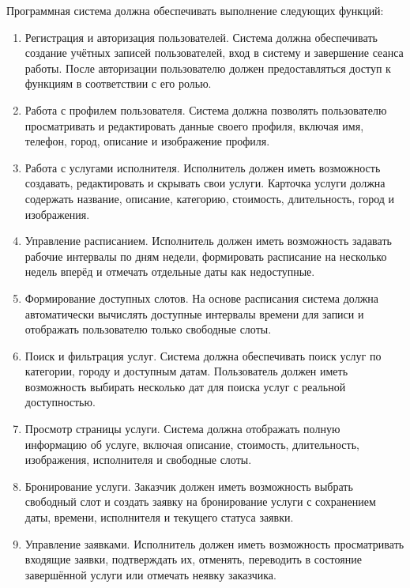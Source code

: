 Программная система должна обеспечивать выполнение следующих функций:
\begin{enumerate}
	\item Регистрация и авторизация пользователей.  
	Система должна обеспечивать создание учётных записей пользователей, вход в систему и завершение сеанса работы. После авторизации пользователю должен предоставляться доступ к функциям в соответствии с его ролью.
	
	\item Работа с профилем пользователя.  
	Система должна позволять пользователю просматривать и редактировать данные своего профиля, включая имя, телефон, город, описание и изображение профиля.
	
	\item Работа с услугами исполнителя.  
	Исполнитель должен иметь возможность создавать, редактировать и скрывать свои услуги. Карточка услуги должна содержать название, описание, категорию, стоимость, длительность, город и изображения.
	
	\item Управление расписанием.  
	Исполнитель должен иметь возможность задавать рабочие интервалы по дням недели, формировать расписание на несколько недель вперёд и отмечать отдельные даты как недоступные.
	
	\item Формирование доступных слотов.  
	На основе расписания система должна автоматически вычислять доступные интервалы времени для записи и отображать пользователю только свободные слоты.
	
	\item Поиск и фильтрация услуг.  
	Система должна обеспечивать поиск услуг по категории, городу и доступным датам. Пользователь должен иметь возможность выбирать несколько дат для поиска услуг с реальной доступностью.
	
	\item Просмотр страницы услуги.  
	Система должна отображать полную информацию об услуге, включая описание, стоимость, длительность, изображения, исполнителя и свободные слоты.
	
	\item Бронирование услуги.  
	Заказчик должен иметь возможность выбрать свободный слот и создать заявку на бронирование услуги с сохранением даты, времени, исполнителя и текущего статуса заявки.
	
	\item Управление заявками.  
	Исполнитель должен иметь возможность просматривать входящие заявки, подтверждать их, отменять, переводить в состояние завершённой услуги или отмечать неявку заказчика.
	

\end{enumerate}
